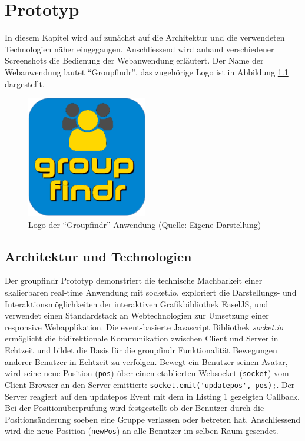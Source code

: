 \chapter{Prototyp}
\label{prototyp}

In diesem Kapitel wird auf zunächst auf die Architektur und die verwendeten Technologien näher eingegangen. Anschliessend wird anhand verschiedener Screenshots die Bedienung der Webanwendung erläutert. Der Name der Webanwendung lautet "`Groupfindr"', das zugehörige Logo ist in Abbildung \ref{logo} dargestellt.


\begin{figure}[h]
\centering
\includegraphics{graphiken/logo.png}%
\caption{Logo der "`Groupfindr"' Anwendung (Quelle: Eigene Darstellung)}%
\label{logo}%
\end{figure}


\section{Architektur und Technologien}
\label{architektur_technologie}

Der groupfindr Prototyp demonstriert die technische Machbarkeit einer skalierbaren real-time Anwendung mit socket.io, exploriert die Darstellungs- und Interaktionsmöglichkeiten der interaktiven Grafikbibliothek EaselJS, und verwendet einen Standardstack an Webtechnologien zur Umsetzung einer responsive Webapplikation.
\newline\newline
Die event-basierte Javascript Bibliothek \textit{\href{http://socket.io/}{socket.io}} ermöglicht die bidirektionale Kommunikation zwischen Client und Server in Echtzeit und bildet die Basis für die groupfindr Funktionalität Bewegungen anderer Benutzer in Echtzeit zu verfolgen. Bewegt ein Benutzer seinen Avatar, wird seine neue Position (\verb|pos|) über einen etablierten Websocket (\verb|socket|) vom Client-Browser an den Server emittiert: \verb|socket.emit('updatepos', pos);|. Der Server reagiert auf den updatepos Event mit dem in Listing 1 gezeigten Callback. Bei der Positionüberprüfung wird festgestellt ob der Benutzer durch die Positionsänderung soeben eine Gruppe verlassen oder betreten hat. Anschliessend wird die neue Position (\verb|newPos|) an alle Benutzer im selben Raum gesendet.

